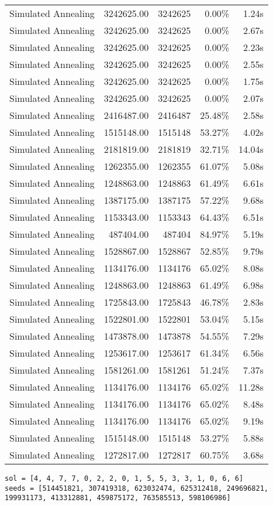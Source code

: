 \begin{table}[ht]
\begin{tabular}{|r|r|r|r|r|}
Simulated Annealing & 3242625.00 & 3242625 & 0.00\% & 1.24s\\
Simulated Annealing & 3242625.00 & 3242625 & 0.00\% & 2.67s\\
Simulated Annealing & 3242625.00 & 3242625 & 0.00\% & 2.23s\\
Simulated Annealing & 3242625.00 & 3242625 & 0.00\% & 2.55s\\
Simulated Annealing & 3242625.00 & 3242625 & 0.00\% & 1.75s\\
Simulated Annealing & 3242625.00 & 3242625 & 0.00\% & 2.07s\\
Simulated Annealing & 2416487.00 & 2416487 & 25.48\% & 2.58s\\
Simulated Annealing & 1515148.00 & 1515148 & 53.27\% & 4.02s\\
Simulated Annealing & 2181819.00 & 2181819 & 32.71\% & 14.04s\\
Simulated Annealing & 1262355.00 & 1262355 & 61.07\% & 5.08s\\
Simulated Annealing & 1248863.00 & 1248863 & 61.49\% & 6.61s\\
Simulated Annealing & 1387175.00 & 1387175 & 57.22\% & 9.68s\\
Simulated Annealing & 1153343.00 & 1153343 & 64.43\% & 6.51s\\
Simulated Annealing & 487404.00 & 487404 & 84.97\% & 5.19s\\
Simulated Annealing & 1528867.00 & 1528867 & 52.85\% & 9.79s\\
Simulated Annealing & 1134176.00 & 1134176 & 65.02\% & 8.08s\\
Simulated Annealing & 1248863.00 & 1248863 & 61.49\% & 6.98s\\
Simulated Annealing & 1725843.00 & 1725843 & 46.78\% & 2.83s\\
Simulated Annealing & 1522801.00 & 1522801 & 53.04\% & 5.15s\\
Simulated Annealing & 1473878.00 & 1473878 & 54.55\% & 7.29s\\
Simulated Annealing & 1253617.00 & 1253617 & 61.34\% & 6.56s\\
Simulated Annealing & 1581261.00 & 1581261 & 51.24\% & 7.37s\\
Simulated Annealing & 1134176.00 & 1134176 & 65.02\% & 11.28s\\
Simulated Annealing & 1134176.00 & 1134176 & 65.02\% & 8.48s\\
Simulated Annealing & 1134176.00 & 1134176 & 65.02\% & 9.19s\\
Simulated Annealing & 1515148.00 & 1515148 & 53.27\% & 5.88s\\
Simulated Annealing & 1272817.00 & 1272817 & 60.75\% & 3.68s\\
\end{tabular}%
\end{table}
\begin{lstlisting}[label={lst:call7vehicle3},caption=Optimal solution call\_7\_vehicle\_3]
sol = [4, 4, 7, 7, 0, 2, 2, 0, 1, 5, 5, 3, 3, 1, 0, 6, 6]
seeds = [514451821, 307419318, 623032474, 625312418, 249696821, 199931173, 413312881, 459875172, 763585513, 598106986]
\end{lstlisting}%
\clearpage


